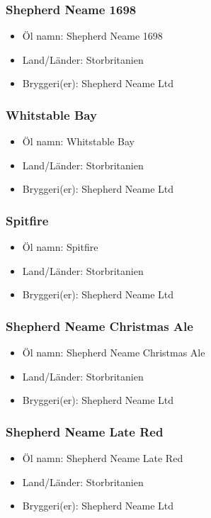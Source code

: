 \documentclass[11pt]{article}
\begin{document}
\subsubsection{Shepherd Neame 1698}
\label{sec:org43aaed4}
\begin{itemize}
\item Öl namn: Shepherd Neame 1698
\item Land/Länder: Storbritanien
\item Bryggeri(er): Shepherd Neame Ltd
\end{itemize}
\subsubsection{Whitstable Bay}
\label{sec:org54bf17e}
\begin{itemize}
\item Öl namn: Whitstable Bay
\item Land/Länder: Storbritanien
\item Bryggeri(er): Shepherd Neame Ltd
\end{itemize}
\subsubsection{Spitfire}
\label{sec:org792c60c}
\begin{itemize}
\item Öl namn: Spitfire
\item Land/Länder: Storbritanien
\item Bryggeri(er): Shepherd Neame Ltd
\end{itemize}
\subsubsection{Shepherd Neame Christmas Ale}
\label{sec:orgc8f0232}
\begin{itemize}
\item Öl namn: Shepherd Neame Christmas Ale
\item Land/Länder: Storbritanien
\item Bryggeri(er): Shepherd Neame Ltd
\end{itemize}
\subsubsection{Shepherd Neame Late Red}
\label{sec:org96563d3}
\begin{itemize}
\item Öl namn: Shepherd Neame Late Red
\item Land/Länder: Storbritanien
\item Bryggeri(er): Shepherd Neame Ltd
\end{itemize}
\end{document}
